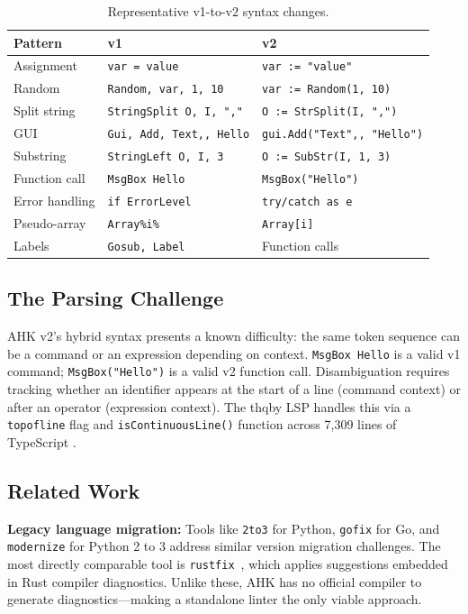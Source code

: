 \documentclass[11pt,a4paper]{article}
\begin{document}
\begin{enumerate}
\begin{table}[h]
\centering\small
\caption{Representative v1-to-v2 syntax changes.}
\label{tab:syntax}
\begin{tabular}{lll}
\toprule
\textbf{Pattern} & \textbf{v1} & \textbf{v2} \\
\midrule
Assignment & \texttt{var = value} & \texttt{var := "value"} \\
Random & \texttt{Random, var, 1, 10} & \texttt{var := Random(1, 10)} \\
Split string & \texttt{StringSplit O, I, ","} & \texttt{O := StrSplit(I, ",")} \\
GUI & \texttt{Gui, Add, Text,, Hello} & \texttt{gui.Add("Text",, "Hello")} \\
Substring & \texttt{StringLeft O, I, 3} & \texttt{O := SubStr(I, 1, 3)} \\
Function call & \texttt{MsgBox Hello} & \texttt{MsgBox("Hello")} \\
Error handling & \texttt{if ErrorLevel} & \texttt{try/catch as e} \\
Pseudo-array & \texttt{Array\%i\%} & \texttt{Array[i]} \\
Labels & \texttt{Gosub, Label} & Function calls \\
\bottomrule
\end{tabular}
\end{table}

\subsection{The Parsing Challenge}

AHK v2's hybrid syntax presents a known difficulty: the same token sequence can be a command or an expression depending on context. \texttt{MsgBox Hello} is a valid v1 command; \texttt{MsgBox("Hello")} is a valid v2 function call. Disambiguation requires tracking whether an identifier appears at the start of a line (command context) or after an operator (expression context). The thqby LSP handles this via a \texttt{topofline} flag and \texttt{isContinuousLine()} function across 7,309 lines of TypeScript \cite{thqby}.

\subsection{Related Work}

\textbf{Legacy language migration:} Tools like \texttt{2to3} for Python, \texttt{gofix} for Go, and \texttt{modernize} for Python 2 to 3 address similar version migration challenges. The most directly comparable tool is \texttt{rustfix}~\cite{rustfix}, which applies suggestions embedded in Rust compiler diagnostics. Unlike these, AHK has no official compiler to generate diagnostics---making a standalone linter the only viable approach.


\end{enumerate}
\end{document}
